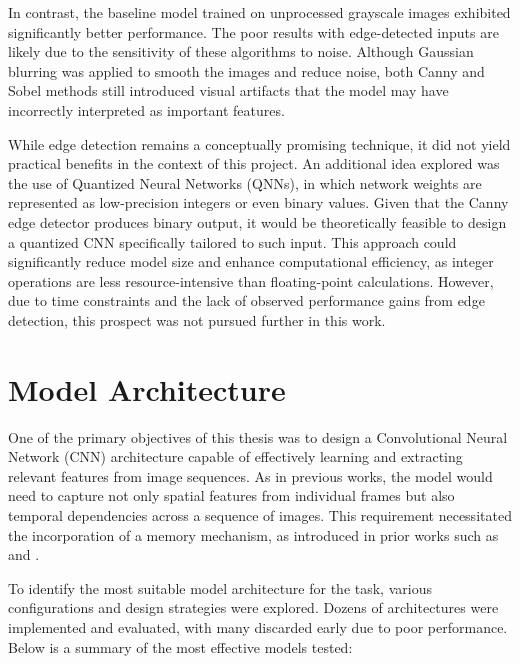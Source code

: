 In contrast, the baseline model trained on unprocessed grayscale images exhibited significantly better performance. The poor results with edge-detected inputs are likely due to the sensitivity of these algorithms to noise. Although Gaussian blurring was applied to smooth the images and reduce noise, both Canny and Sobel methods still introduced visual artifacts that the model may have incorrectly interpreted as important features.

While edge detection remains a conceptually promising technique, it did not yield practical benefits in the context of this project. An additional idea explored was the use of Quantized Neural Networks (QNNs), in which network weights are represented as low-precision integers or even binary values. Given that the Canny edge detector produces binary output, it would be theoretically feasible to design a quantized CNN specifically tailored to such input. This approach could significantly reduce model size and enhance computational efficiency, as integer operations are less resource-intensive than floating-point calculations. However, due to time constraints and the lack of observed performance gains from edge detection, this prospect was not pursued further in this work.

\section{Model Architecture}

One of the primary objectives of this thesis was to design a Convolutional Neural Network (CNN) architecture capable of effectively learning and extracting relevant features from image sequences. As in previous works, the model would need to capture not only spatial features from individual frames but also temporal dependencies across a sequence of images. This requirement necessitated the incorporation of a memory mechanism, as introduced in prior works such as \autocite{schneeberger2024end} and \autocite{schaller2023train}.

To identify the most suitable model architecture for the task, various configurations and design strategies were explored. Dozens of architectures were implemented and evaluated, with many discarded early due to poor performance. Below is a summary of the most effective models tested:

